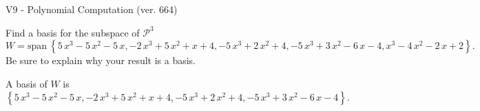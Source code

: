 \begin{exercise}
  \begin{exerciseTitle}V9 - Polynomial Computation (ver. 664)\end{exerciseTitle}
  \begin{exerciseStatement}
    Find a basis for the subspace of \(\mathcal{P}^3\) 
\[W=\mathrm{span}\ \left\{5 \, x^{3} - 5 \, x^{2} - 5 \, x , -2 \, x^{3} + 5 \, x^{2} + x + 4 , -5 \, x^{3} + 2 \, x^{2} + 4 , -5 \, x^{3} + 3 \, x^{2} - 6 \, x - 4 , x^{3} - 4 \, x^{2} - 2 \, x + 2\right\}.\]
 Be sure to explain why your result is a basis.


  \end{exerciseStatement}
  \begin{exerciseAnswer}
   A basis of \(W\) is  \(\left\{5 \, x^{3} - 5 \, x^{2} - 5 \, x , -2 \, x^{3} + 5 \, x^{2} + x + 4 , -5 \, x^{3} + 2 \, x^{2} + 4 , -5 \, x^{3} + 3 \, x^{2} - 6 \, x - 4\right\}\).
  


  \end{exerciseAnswer}
\end{exercise}